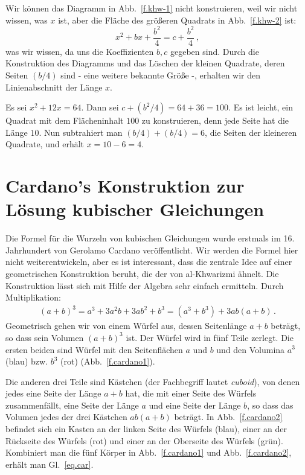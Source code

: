 Wir können das Diagramm in Abb.~\ref{f.khw-1} nicht konstruieren, weil wir nicht wissen, was $x$ ist, aber die Fläche des größeren Quadrats in Abb.~\ref{f.khw-2} ist:
\[
x^2+bx+\frac{b^2}{4}=c+\frac{b^2}{4}\,,
\]
was wir wissen, da uns die Koeffizienten $b,c$ gegeben sind. Durch die Konstruktion des Diagramms und das Löschen der kleinen Quadrate, deren Seiten $(b/4)$ sind - eine weitere bekannte Größe -, erhalten wir den Linienabschnitt der Länge $x$.

\begin{example}
Es sei $x^2+12x=64$. Dann sei $c+(b^2/4)=64+36=100$. Es ist leicht, ein Quadrat mit dem Flächeninhalt $100$ zu konstruieren, denn jede Seite hat die Länge $10$. Nun subtrahiert man $(b/4)+(b/4)=6$, die Seiten der kleineren Quadrate, und erhält $x=10-6=4$.
\end{example}

\section{Cardano's Konstruktion zur Lösung kubischer Gleichungen}\label{s.cardano}

Die Formel für die Wurzeln von kubischen Gleichungen wurde erstmals im 16. Jahrhundert von Gerolamo Cardano veröffentlicht. Wir werden die Formel hier nicht weiterentwickeln, aber es ist interessant, dass die zentrale Idee auf einer geometrischen Konstruktion beruht, die der von al-Khwarizmi ähnelt. Die Konstruktion lässt sich mit Hilfe der Algebra sehr einfach ermitteln. Durch Multiplikation:
\begin{align}\label{eq.car}
(a+b)^3=a^3+3a^2b+3ab^2+b^3=(a^3+b^3)+3ab(a+b)\,.
\end{align}
Geometrisch gehen wir von einem Würfel aus, dessen Seitenlänge $a+b$ beträgt, so dass sein Volumen $(a+b)^3$ ist. Der Würfel wird in fünf Teile zerlegt. Die ersten beiden sind Würfel mit den Seitenflächen $a$ und $b$ und den Volumina $a^3$ (blau) bzw. $b^3$ (rot) (Abb.~\ref{f.cardano1}).

Die anderen drei Teile sind Kästchen (der Fachbegriff lautet \emph{cuboid}), von denen jedes eine Seite der Länge $a+b$ hat, die mit einer Seite des Würfels zusammenfällt, eine Seite der Länge $a$ und eine Seite der Länge $b$, so dass das Volumen jedes der drei Kästchen $ab(a+b)$ beträgt. In Abb.~\ref{f.cardano2} befindet sich ein Kasten an der linken Seite des Würfels (blau), einer an der Rückseite des Würfels (rot) und einer an der Oberseite des Würfels (grün).
Kombiniert man die fünf Körper in Abb.~\ref{f.cardano1} und Abb.~\ref{f.cardano2}, erhält man Gl.~\ref{eq.car}.


